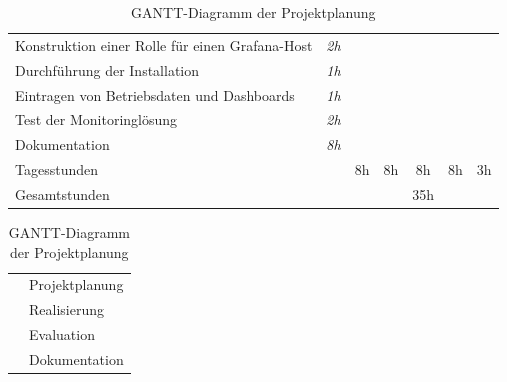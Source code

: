 \documentclass[11pt,a4paper]{article}
\begin{document}
\begin{table}[!htbp]
\begin{tabular}{l c | c c c c c}
    Konstruktion einer\glsadd{rollen} Rolle für einen Grafana-Host
                  & \emph{2h} &                          &                          & \cellcolor[HTML]{FF8C64} &                          &                          \\
    Durchführung der Installation
                  & \emph{1h} &                          &                          &                          & \cellcolor[HTML]{FF8C64} &                          \\
    Eintragen von Betriebsdaten und Dashboards
                  & \emph{1h} &                          &                          &                          & \cellcolor[HTML]{FF665A} &                          \\
    Test der Monitoringlösung
                  & \emph{2h} &                          &                          &                          & \cellcolor[HTML]{FF665A} & \cellcolor[HTML]{FF665A} \\
    Dokumentation
                  & \emph{8h} & \cellcolor[HTML]{7D6B7D} & \cellcolor[HTML]{7D6B7D} & \cellcolor[HTML]{7D6B7D} & \cellcolor[HTML]{7D6B7D} & \cellcolor[HTML]{7D6B7D} \\
    \hline
    Tagesstunden  &           & 8h                       & 8h                       & 8h                       & 8h                       & 3h                       \\
    \hline
    Gesamtstunden &           &                          &                          & 35h                      &                          &                          \\
  \end{tabular}
  \caption{GANTT-Diagramm der Projektplanung}
  \label{table:gantt}
  \begin{tabular}{c l}
    \cellcolor[HTML]{FFF587} & Projektplanung \\
    \cellcolor[HTML]{FF8C64} & Realisierung   \\
    \cellcolor[HTML]{FF665A} & Evaluation     \\
    \cellcolor[HTML]{7D6B7D} & Dokumentation  \\
  \end{tabular}
\end{table}
\end{document}
